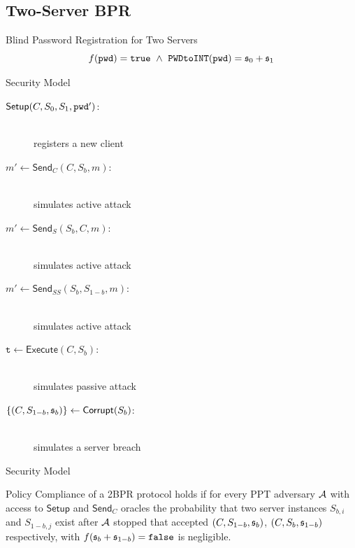 \documentclass[notes,xcolor=dvipsnames]{beamer}
\begin{document}

\subsection{Two-Server BPR}

\begin{frame}{Blind Password Registration for Two Servers}
  \[
    f(\mathtt{pwd})=\mathtt{true} ~ \wedge ~ \texttt{PWDtoINT}(\mathtt{pwd})=\mathfrak{s}_0 + \mathfrak{s}_1
  \]
\end{frame}

\begin{frame}{Security Model}
    \begin{description}
      \item[$\mathsf{Setup}(C,S_{0},S_1,\mathtt{pwd}')$:] \hfill \\ registers a new client
      \item[$m'\gets\mathsf{Send}_C(C,S_{b},m)$:] \hfill \\ simulates active attack
      \item[$m'\gets\mathsf{Send}_S(S_b,C,m)$:] \hfill \\ simulates active attack
      \item[$m'\gets\mathsf{Send}_{SS}(S_b,S_{1-b},m)$:] \hfill \\ simulates active attack
      \item[$\mathtt{t}\gets\mathsf{Execute}(C,S_b)$:] \hfill \\ simulates passive attack
      \item[$\{(C,S_{1-b},\mathfrak{s}_b)\}\gets\mathsf{Corrupt}(S_b)$:] \hfill \\ simulates a server breach
    \end{description}
\end{frame}

\begin{frame}{Security Model}
  \begin{definition}\label{def:pc}
  Policy Compliance of a 2BPR protocol holds if for every PPT adversary $\mathcal{A}$ with access to $\mathsf{Setup}$ and $\mathsf{Send}_C$ oracles the probability that two server instances $S_{b,i}$ and $S_{1-b,j}$ exist after $\mathcal{A}$ stopped that accepted $(C,S_{1-b},\mathfrak{s}_b)$, $(C,S_{b},\mathfrak{s}_{1-b})$ respectively, with $f(\mathfrak{s}_b+\mathfrak{s}_{1-b})=\mathtt{false}$ is negligible.
  \end{definition}
\end{frame}
\end{document}
